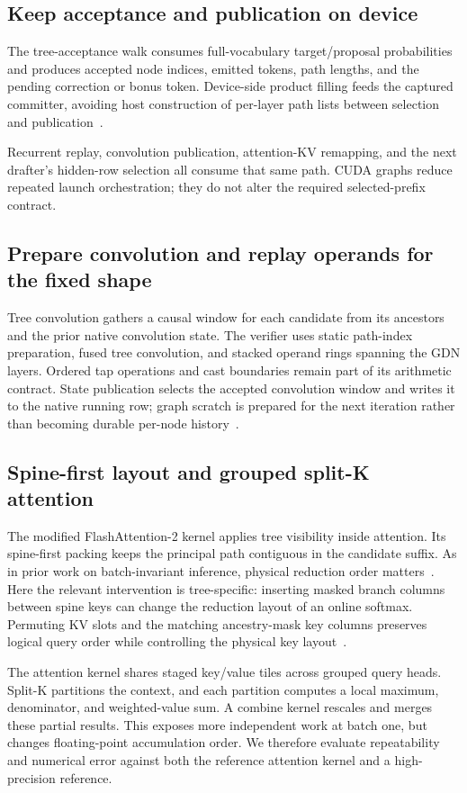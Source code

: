 \documentclass[conference]{IEEEtran}
\begin{document}
\subsection{Keep acceptance and publication on device}
The tree-acceptance walk consumes full-vocabulary target/proposal probabilities and produces accepted node indices, emitted tokens, path lengths, and the pending correction or bonus token. Device-side product filling feeds the captured committer, avoiding host construction of per-layer path lists between selection and publication~\cite{lumo2026archive}.

Recurrent replay, convolution publication, attention-KV remapping, and the next drafter's hidden-row selection all consume that same path. CUDA graphs reduce repeated launch orchestration; they do not alter the required selected-prefix contract.

\subsection{Prepare convolution and replay operands for the fixed shape}
Tree convolution gathers a causal window for each candidate from its ancestors and the prior native convolution state. The verifier uses static path-index preparation, fused tree convolution, and stacked operand rings spanning the GDN layers. Ordered tap operations and cast boundaries remain part of its arithmetic contract. State publication selects the accepted convolution window and writes it to the native running row; graph scratch is prepared for the next iteration rather than becoming durable per-node history~\cite{lumo2026archive}.

\subsection{Spine-first layout and grouped split-K attention}
\label{sec:reconstruction-numerics}
The modified FlashAttention-2 kernel applies tree visibility inside attention. Its spine-first packing keeps the principal path contiguous in the candidate suffix. As in prior work on batch-invariant inference, physical reduction order matters~\cite{he2025determinism}. Here the relevant intervention is tree-specific: inserting masked branch columns between spine keys can change the reduction layout of an online softmax. Permuting KV slots and the matching ancestry-mask key columns preserves logical query order while controlling the physical key layout~\cite{lumo2026archive}.

The attention kernel shares staged key/value tiles across grouped query heads. Split-K partitions the context, and each partition computes a local maximum, denominator, and weighted-value sum. A combine kernel rescales and merges these partial results. This exposes more independent work at batch one, but changes floating-point accumulation order. We therefore evaluate repeatability and numerical error against both the reference attention kernel and a high-precision reference.
\end{document}

